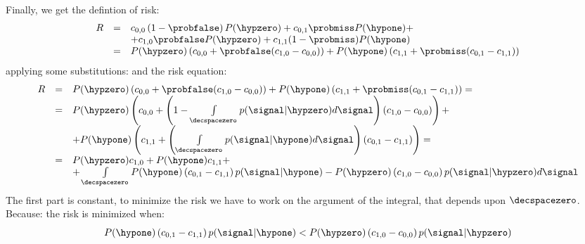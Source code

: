 Finally, we get the defintion of risk:
\begin{equation}
\begin{array}{rcl} 
R & = & c_{0,0} \braces{1-\probfalse} P(\hypzero) + c_{0,1} \probmiss P(\hypone) + \\ 
  &   &  + c_{1,0} \probfalse P(\hypzero) + c_{1,1} (1-\probmiss) P(\hypone) \\
  & = & P(\hypzero) \braces{c_{0,0} + \probfalse (c_{1,0} - c_{0,0})} + P(\hypone) \braces{c_{1,1} + \probmiss (c_{0,1} - c_{1,1})}
\end{array}
\end{equation}
applying some substitutions:
and the risk equation:
\begin{equation}
\begin{array}{rcl}
R & = & P(\hypzero) \braces{c_{0,0} + \probfalse (c_{1,0} - c_{0,0})} + P(\hypone) \braces{c_{1,1} + \probmiss (c_{0,1} - c_{1,1})} = \\ 
  & = & P(\hypzero) \braces{c_{0,0} + \braces{1 - \int\limits_{\decspacezero}p(\signal|\hypzero)d\signal} (c_{1,0} - c_{0,0})} + \\ 
  &   &  + P(\hypone) \braces{c_{1,1} + \braces{\int\limits_{\decspacezero}p(\signal|\hypone)d\signal} (c_{0,1} - c_{1,1})} = \\ 
  & = & P(\hypzero) c_{1,0} + P(\hypone) c_{1,1} + \\
  &   & + \int\limits_{\decspacezero} P(\hypone)\braces{c_{0,1} - c_{1,1}} p(\signal|\hypone) - P(\hypzero)\braces{c_{1,0} - c_{0,0}} p(\signal|\hypzero) d\signal
\end{array}
\end{equation}
The first part is constant, to minimize the risk we have to work on the argument of the integral, that depends upon ${\decspacezero}$. Because:
the risk is minimized when:
\begin{equation}
P(\hypone)\braces{c_{0,1} - c_{1,1}} p(\signal|\hypone) < P(\hypzero)\braces{c_{1,0} - c_{0,0}} p(\signal|\hypzero)
\end{equation}
